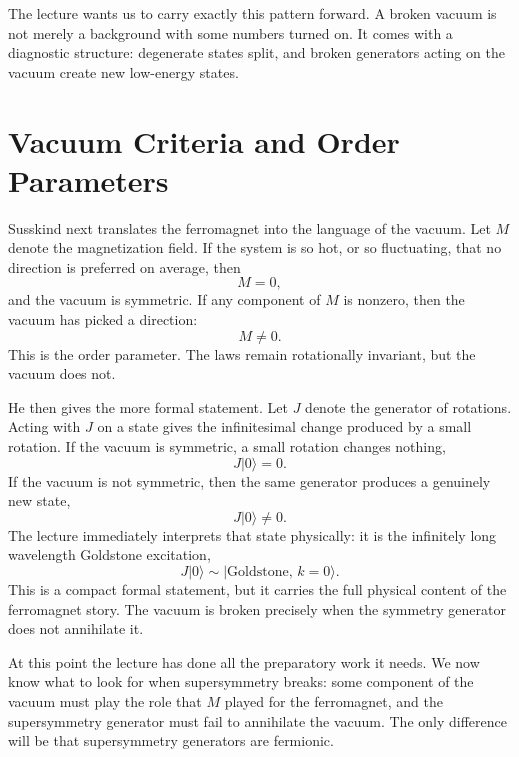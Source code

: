 The lecture wants us to carry exactly this pattern forward. A broken vacuum is not merely a background with some numbers turned on. It comes with a diagnostic structure: degenerate states split, and broken generators acting on the vacuum create new low-energy states.

\section{Vacuum Criteria and Order Parameters}

Susskind next translates the ferromagnet into the language of the vacuum. Let \(M\) denote the magnetization field. If the system is so hot, or so fluctuating, that no direction is preferred on average, then
\begin{equation}
M=0,
\end{equation}
and the vacuum is symmetric. If any component of \(M\) is nonzero, then the vacuum has picked a direction:
\begin{equation}
M\neq 0.
\end{equation}
This is the order parameter. The laws remain rotationally invariant, but the vacuum does not.

He then gives the more formal statement. Let \(J\) denote the generator of rotations. Acting with \(J\) on a state gives the infinitesimal change produced by a small rotation. If the vacuum is symmetric, a small rotation changes nothing,
\begin{equation}
J|0\rangle=0.
\end{equation}
If the vacuum is not symmetric, then the same generator produces a genuinely new state,
\begin{equation}
J|0\rangle\neq 0.
\end{equation}
The lecture immediately interprets that state physically: it is the infinitely long wavelength Goldstone excitation,
\begin{equation}
J|0\rangle \sim |\text{Goldstone},\,k=0\rangle.
\end{equation}
This is a compact formal statement, but it carries the full physical content of the ferromagnet story. The vacuum is broken precisely when the symmetry generator does not annihilate it.

At this point the lecture has done all the preparatory work it needs. We now know what to look for when supersymmetry breaks: some component of the vacuum must play the role that \(M\) played for the ferromagnet, and the supersymmetry generator must fail to annihilate the vacuum. The only difference will be that supersymmetry generators are fermionic.

